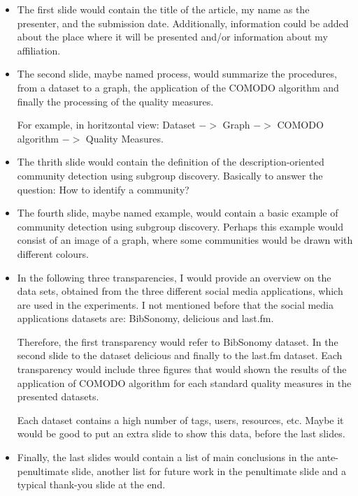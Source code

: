 \documentclass[a4paper]{article}
\begin{document}
\begin{itemize}
	\item The first slide would contain the title of the article, my name as the presenter, and the submission date. Additionally, information could be added about the place where it will be presented and/or information about my affiliation.
	
	\item The second slide, maybe named process, would summarize the procedures, from a dataset to a graph, the application of the COMODO algorithm and finally the processing of the quality measures. 
	
	For example, in horitzontal view: Dataset $->$ Graph $->$ COMODO algorithm $->$ Quality Measures.
	
	\item The thrith slide would contain the definition of the description-oriented community detection using subgroup discovery. Basically to answer the question: How to identify a community?
	
	\item The fourth slide, maybe named example, would contain a basic example of community detection using subgroup discovery. Perhaps this example would consist of an image of a graph, where some communities would be drawn with different colours.
	
	\item In the following three transparencies, I would provide an overview on the data sets, obtained from the three different social media applications, which are used in the experiments. I not mentioned before that the social media applications datasets are: BibSonomy, delicious and last.fm.
	
	Therefore, the first transparency would refer to BibSonomy dataset. In the second slide to the dataset delicious and finally to the last.fm dataset. Each transparency would include three figures that would shown the results of the application of COMODO algorithm for each standard quality measures in the presented datasets.
	
	Each dataset contains a high number of tags, users, resources, etc. Maybe it would be good to put an extra slide to show this data, before the last slides.
	
	\item Finally, the last slides would contain a list of main conclusions in the ante-penultimate slide, another list for future work in the penultimate slide and a typical thank-you slide at the end.
\end{itemize}
\end{document}
